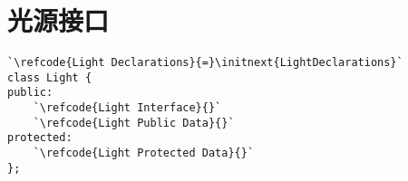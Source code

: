 \section{光源接口}\label{sec:光源接口}

\label{code:overview_Light}
\begin{lstlisting}
`\refcode{Light Declarations}{=}\initnext{LightDeclarations}`
class Light {
public:
    `\refcode{Light Interface}{}`
    `\refcode{Light Public Data}{}`
protected:
    `\refcode{Light Protected Data}{}`
};
\end{lstlisting}